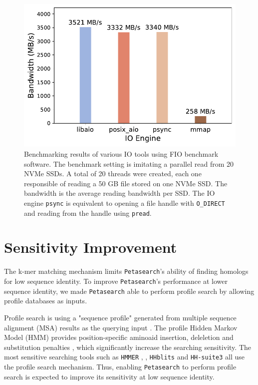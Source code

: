 \begin{figpage}
\begin{figure}[htbp]
    \label{fig:prot_seq_compress}
    \bigskip
    \centering
    \includegraphics[width=.65\textwidth]{images/fio_benchmark.pdf}
    \caption{Benchmarking results of various IO tools using FIO benchmark software.
      The benchmark setting is imitating a parallel read from 20 NVMe SSDs.
      A total of 20 threads were created, each one responsible of reading a 50 GB file stored on one NVMe SSD.
      The bandwidth is the average reading bandwidth per SSD.
      The IO engine \texttt{psync} is equivalent to opening a file handle with \texttt{O\_DIRECT} and reading from the handle using \texttt{pread}.}
    \label{fig:fio_benchmark}
  \end{figure}
\end{figpage}
\pagebreak

\section{Sensitivity Improvement} \label{section:sensitivity-improvement}

The k-mer matching mechanism limits \texttt{Petasearch}'s ability of finding homologs for low sequence identity.
To improve \texttt{Petasearch}'s performance at lower sequence identity, we made \texttt{Petasearch} able to perform profile search by allowing profile databases as inputs.

Profile search is using a "sequence profile" generated from multiple sequence alignment (MSA) results as the querying input \cite{steinegger_hh-suite3_2019}.
The profile Hidden Markov Model (HMM) provides position-specific aminoaid insertion, deleletion and substitution penalties \cite{steinegger2019hh}, which significantly increase the searching sensitivity.
The most sensitive searching tools such as \texttt{HMMER} \cite{eddy_new_2009}, \cite{eddy_accelerated_2011}, \texttt{HHblits} \cite{remmert_hhblits_2012} and \texttt{HH-suite3} \cite{steinegger_hh-suite3_2019} all use the profile search mechanism.
Thus, enabling \texttt{Petasearch} to perform profile search is expected to improve its sensitivity at low sequence identity.


